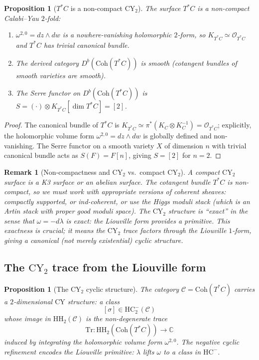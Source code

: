\documentclass[11pt]{article}
\theoremstyle{garamondthm}
\newtheorem{proposition}[theorem]{Proposition}
\theoremstyle{garamonddef}
\theoremstyle{garamondrem}
\newtheorem{remark}[theorem]{Remark}
\newcommand{\Coh}{\mathrm{Coh}}
\newcommand{\CY}{\mathrm{CY}}
\newcommand{\HH}{\mathrm{HH}}
\newcommand{\HC}{\mathrm{HC}}
\newcommand{\Tr}{\mathrm{Tr}}
\newcommand{\cC}{\mathcal{C}}
\newcommand{\cO}{\mathcal{O}}
\begin{document}
\begin{proposition}[$T^*C$ is a non-compact $\CY_2$]
\label{prop:cotangent-cy2}
The surface $T^*C$ is a non-compact Calabi--Yau $2$-fold:
\begin{enumerate}[label=(\roman*)]
 \item $\omega^{2,0} = dz \wedge dw$ is a nowhere-vanishing holomorphic $2$-form, so $K_{T^*C} \simeq \cO_{T^*C}$ and $T^*C$ has trivial canonical bundle.
 \item The derived category $D^b(\Coh(T^*C))$ is smooth (cotangent bundles of smooth varieties are smooth).
 \item The Serre functor on $D^b(\Coh(T^*C))$ is $S = (\cdot) \otimes K_{T^*C}[\dim T^*C] = [2]$.
\end{enumerate}
\end{proposition}

\begin{proof}
The canonical bundle of $T^*C$ is $K_{T^*C} \simeq \pi^*(K_C \otimes K_C^{-1}) = \cO_{T^*C}$; explicitly, the holomorphic volume form $\omega^{2,0} = dz \wedge dw$ is globally defined and non-vanishing. The Serre functor on a smooth variety $X$ of dimension $n$ with trivial canonical bundle acts as $S(F) = F[n]$, giving $S = [2]$ for $n = 2$.
\end{proof}

\begin{remark}[Non-compactness and $\CY_2$ vs.\ compact $\CY_2$]
\label{rem:noncompact-cy2}
A compact $\CY_2$ surface is a K3 surface or an abelian surface. The cotangent bundle $T^*C$ is non-compact, so we must work with appropriate versions of coherent sheaves: compactly supported, or ind-coherent, or use the Higgs moduli stack (which is an Artin stack with proper good moduli space). The $\CY_2$ structure is ``exact'' in the sense that $\omega = -d\lambda$ is exact: the Liouville form provides a primitive. This exactness is crucial; it means the $\CY_2$ trace factors through the Liouville $1$-form, giving a \emph{canonical} (not merely existential) cyclic structure.
\end{remark}

\subsection{The $\CY_2$ trace from the Liouville form}
\label{ssec:cy2-trace}

\begin{proposition}[The $\CY_2$ cyclic structure]
\label{prop:cy2-cyclic}
The category $\cC = \Coh(T^*C)$ carries a $2$-dimensional $\CY$ structure: a class
\[
 [\sigma] \in \HC^-_2(\cC)
\]
whose image in $\HH_2(\cC)$ is the non-degenerate trace
\[
 \Tr \colon \HH_2(\Coh(T^*C)) \longrightarrow \mathbb{C}
\]
induced by integrating the holomorphic volume form $\omega^{2,0}$. The negative cyclic refinement encodes the Liouville primitive: $\lambda$ lifts $\omega$ to a class in $\HC^-$.
\end{proposition}
\end{document}

